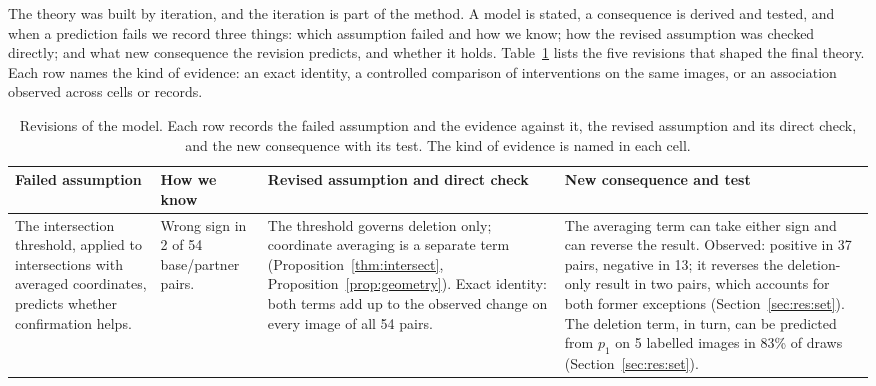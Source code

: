 The theory was built by iteration, and the iteration is part of the method. A model is stated, a consequence is derived and tested, and when a prediction fails we record three things: which assumption failed and how we know; how the revised assumption was checked directly; and what new consequence the revision predicts, and whether it holds. Table~\ref{tab:revisions} lists the five revisions that shaped the final theory. Each row names the kind of evidence: an exact identity, a controlled comparison of interventions on the same images, or an association observed across cells or records.

\begin{table}[tp]
\centering\small\setlength{\tabcolsep}{4pt}
\caption{Revisions of the model. Each row records the failed assumption and the evidence against it, the revised assumption and its direct check, and the new consequence with its test. The kind of evidence is named in each cell.}\label{tab:revisions}
\begin{tabular}{@{}>{\raggedright\arraybackslash}p{3.1cm}>{\raggedright\arraybackslash}p{3.4cm}>{\raggedright\arraybackslash}p{4.0cm}>{\raggedright\arraybackslash}p{4.5cm}@{}}\toprule
Failed assumption & How we know & Revised assumption and direct check & New consequence and test \\\midrule
The intersection threshold, applied to intersections with averaged coordinates, predicts whether confirmation helps. & Wrong sign in 2 of 54 base/partner pairs. & The threshold governs deletion only; coordinate averaging is a separate term (Proposition~\ref{thm:intersect}, Proposition~\ref{prop:geometry}). Exact identity: both terms add up to the observed change on every image of all 54 pairs. & The averaging term can take either sign and can reverse the result. Observed: positive in 37 pairs, negative in 13; it reverses the deletion-only result in two pairs, which accounts for both former exceptions (Section~\ref{sec:res:set}). The deletion term, in turn, can be predicted from $p_1$ on 5 labelled images in 83\% of draws (Section~\ref{sec:res:set}). \\

\end{tabular}
\end{table}
